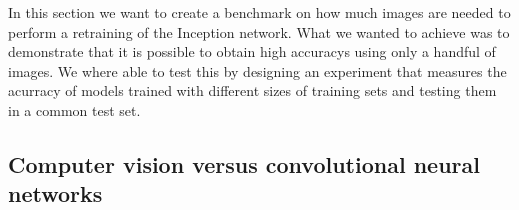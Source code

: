 In this section we want to create a benchmark on how much images are needed to perform a retraining of the Inception network. What we wanted to achieve was to demonstrate that it is possible to obtain high accuracys using only a handful of images. We where able to test this by designing an experiment that measures the acurracy of models trained with different sizes of training sets and testing them in a common test set. 

\subsection{Computer vision versus convolutional neural networks}

\begin{figure}[h]
  \begin{center}
  \end{center}
\end{figure}

\begin{figure}[h]
  \begin{center}
  \end{center}
\end{figure}

